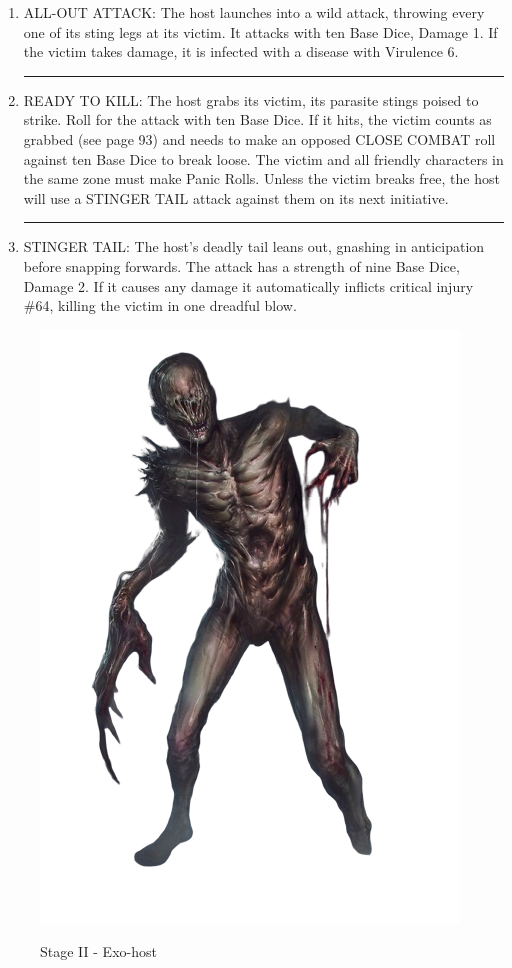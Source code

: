 \begin{rpg-commentbox}{}
\begin{small}
\begin{enumerate}
        \par\noindent\rule{.9\textwidth}{0.4pt}

        \item ALL-OUT ATTACK: The host launches into a wild attack, throwing every one of its sting legs at its victim. It attacks with ten Base Dice, Damage 1. If the victim takes damage, it is infected with a disease with Virulence 6.

        \par\noindent\rule{.9\textwidth}{0.4pt}

        \item READY TO KILL: The host grabs its victim, its parasite stings poised to strike. Roll for the
        attack with ten Base Dice. If it hits, the victim counts as grabbed (see page 93) and needs to
        make an opposed CLOSE COMBAT roll against ten Base Dice to break loose. The victim and all
        friendly characters in the same zone must make Panic Rolls. Unless the victim breaks free,
        the host will use a STINGER TAIL attack against them on its next initiative.

        \par\noindent\rule{.9\textwidth}{0.4pt}


        \item STINGER TAIL: The host's deadly tail leans out,
        gnashing in anticipation before snapping forwards. The attack has a strength of nine Base
        Dice, Damage 2. If it causes any damage it automatically inflicts critical injury \#64, killing
        the victim in one dreadful blow. 
    \end{enumerate}
    \end{small}

\end{rpg-commentbox}

\begin{figure}
    \centering
    \includegraphics[width=.45\textwidth]{img/stage-II-bg.png}
    \label{fig:stage-2}
    \caption*{Stage II - Exo-host}
\end{figure}